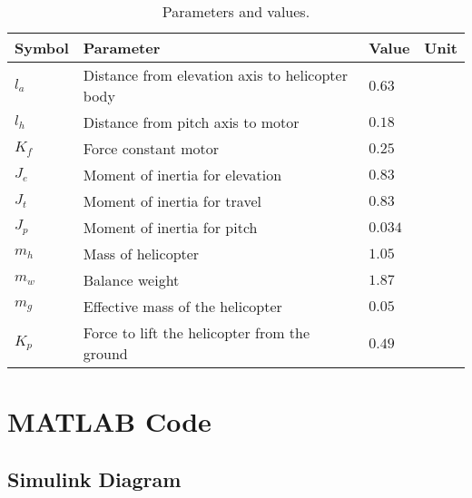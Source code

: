 \begin{table}[tbp]
	\centering
	\caption{Parameters and values.}
	\begin{tabular}{llll}
		\toprule
		Symbol & Parameter & Value & Unit \\
		\midrule
		$l_a$ & Distance from elevation axis to helicopter body & $0.63$ & \meter\\
		$l_h$ & Distance from pitch axis to motor & $0.18$ & \meter\\
		$K_f$ & Force constant motor & $0.25$ & \newton\per\volt\\
		$J_e$ & Moment of inertia for elevation & $0.83$ & \kilogram\usk\meter\squared\\
		$J_t$ & Moment of inertia for travel & $0.83$ & \kilogram\usk\meter\squared\\
		$J_p$ & Moment of inertia for pitch & $0.034$ & \kilogram\usk\meter\squared\\
		$m_h$ & Mass of helicopter & $1.05$ & \kilogram\\
		$m_w$ & Balance weight & $1.87$ & \kilogram\\
		$m_g$ & Effective mass of the helicopter & $0.05$ & \kilogram\\
		$K_p$ & Force to lift the helicopter from the ground & $0.49$ & \newton\\
		\bottomrule
	\end{tabular}
\label{tab:parameters}
\end{table}



\newpage
\section{MATLAB Code}\label{sec:matlab}




\subsection{Simulink Diagram}\label{sec:simulink}


